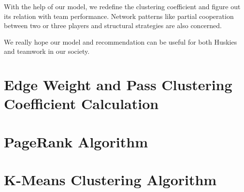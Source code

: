 \documentclass{mcmthesis}
\begin{document}
With the help of our model, we redefine the clustering coefficient and figure out its relation with team performance. Network patterns like partial cooperation between two or three players and structural strategies are also concerned.

We really hope our model and recommendation can be useful for both Huskies and teamwork in our society.
\newpage
    
    

	

\newpage

\begin{appendices}

\section{Edge Weight and Pass Clustering Coefficient Calculation} \label{a:edge}

\newpage
\section{PageRank Algorithm} \label{a:pagerank}

\newpage
\section{K-Means Clustering Algorithm} \label{a:kmeans}

\newpage

\end{appendices}
\end{document}

